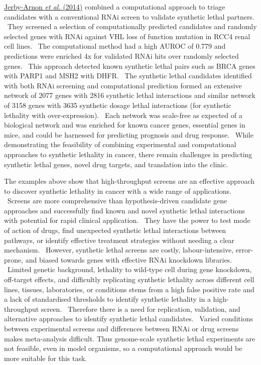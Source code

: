 \hyperlink{ENREF53}{Jerby-Arnon}\hyperlink{ENREF53}{\textit{ et al.}}\hyperlink{ENREF53}{ (2014)} combined a computational approach to triage candidates with a conventional RNAi screen to validate synthetic lethal partners. \ They screened a selection of computationally predicted candidates and randomly selected genes with RNAi against VHL loss of function mutation in RCC4 renal cell lines. \ The computational method had a high AUROC of 0.779 and predictions were enriched 4x for validated RNAi hits over randomly selected genes. \ This approach detected known synthetic lethal pairs such as BRCA genes with PARP1 and MSH2 with DHFR. \ The synthetic lethal candidates identified with both RNAi screening and computational prediction formed an extensive network of 2077 genes with 2816 synthetic lethal interactions and similar network of 3158 genes with 3635 synthetic dosage lethal interactions (for synthetic lethality with over-expression). \ Each network was scale-free as expected of a biological network and was enriched for known cancer genes, essential genes in mice, and could be harnessed for predicting prognosis and drug response. \ While demonstrating the feasibility of combining experimental and computational approaches to synthetic lethality in cancer, there remain challenges in predicting synthetic lethal genes, novel drug targets, and translation into the clinic. \  

The examples above show that high-throughput screens are an effective approach to discover synthetic lethality in cancer with a wide range of applications. \ Screens are more comprehensive than hypothesis-driven candidate gene approaches and successfully find known and novel synthetic lethal interactions with potential for rapid clinical application. \ They have the power to test mode of action of drugs, find unexpected synthetic lethal interactions between pathways, or identify effective treatment strategies without needing a clear mechanism. \ However, synthetic lethal screens are costly, labour-intensive, error-prone, and biased towards genes with effective RNAi knockdown libraries. \ Limited genetic background, lethality to wild-type cell during gene knockdown, off-target effects, and difficultly replicating synthetic lethality across different cell lines, tissues, laboratories, or conditions stems from a high false positive rate and a lack of standardised thresholds to identify synthetic lethality in a high-throughput screen. \ Therefore there is a need for replication, validation, and alternative approaches to identify synthetic lethal candidates. \ Varied conditions between experimental screens and differences between RNAi or drug screens makes meta-analysis difficult. Thus genome-scale synthetic lethal experiments are not feasible, even in model organisms, so a computational approach would be more suitable for this task. \  

